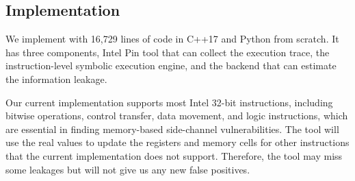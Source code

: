\subsection{Implementation}
We implement \tool{} with 16,729 lines of code in C++17 and Python from scratch. It has three
components, Intel Pin tool that can collect the execution trace, the
instruction-level symbolic execution engine, and the backend that can estimate
the information leakage. 


Our current implementation supports most Intel 32-bit instructions,
including bitwise operations, control transfer, data movement, and logic
instructions, which are essential in finding memory-based side-channel
vulnerabilities. The tool will use the real values to update the registers and memory
cells for other instructions that the current implementation does not support. 
Therefore, the tool may miss some leakages but will not give us any new false positives. 

